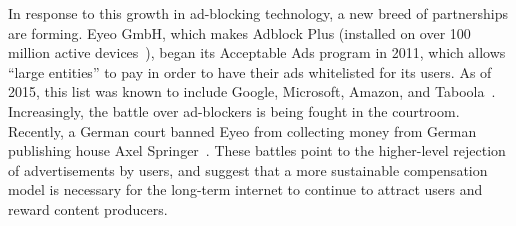 In response to this growth in ad-blocking technology, a new breed of partnerships are forming.
Eyeo GmbH, which makes Adblock Plus (installed on over 100 million active devices~\cite{abp}), began its Acceptable Ads program in 2011, which allows “large entities” to pay in order to have their ads whitelisted for its users.
As of 2015, this list was known to include Google, Microsoft, Amazon, and Taboola~\cite{whitelist}.
Increasingly, the battle over ad-blockers is being fought in the courtroom.
Recently, a German court banned Eyeo from collecting money from German publishing house Axel Springer~\cite{axel}.
These battles point to the higher-level rejection of advertisements by users, and suggest that a more sustainable compensation model is necessary for the long-term internet to continue to attract users and reward content producers.
